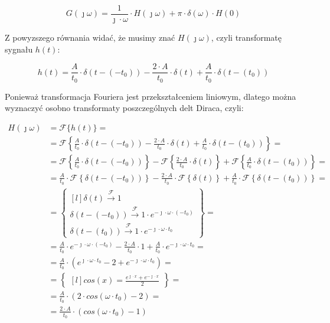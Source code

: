 \begin{task}
\begin{equation}
G(\jmath \omega) = \frac{1}{\jmath \cdot \omega} \cdot H(\jmath \omega) + \pi \cdot \delta(\omega) \cdot H(0)
\end{equation}

Z powyzszego równania widać, że musimy znać $H(\jmath \omega)$, czyli transformatę sygnału $h(t)$:

\begin{equation}
h(t) = \frac{A}{t_{0}} \cdot \delta(t-(-t_{0})) -\frac{2 \cdot A}{t_{0}} \cdot \delta(t) + \frac{A}{t_{0}} \cdot \delta(t-(t_{0}))
\end{equation}

Ponieważ transformacja Fouriera jest przekształceniem liniowym, dlatego można wyznaczyć osobno transformaty poszczególnych delt Diraca, czyli:

\begin{align*}
H(\jmath \omega)&={\mathcal F}\{h(t)\}=\\
&={\mathcal F}\left\{\frac{A}{t_{0}} \cdot \delta(t-(-t_{0})) -\frac{2 \cdot A}{t_{0}} \cdot \delta(t) + \frac{A}{t_{0}} \cdot \delta(t-(t_{0}))\right\}=\\
&={\mathcal F}\left\{\frac{A}{t_{0}} \cdot \delta(t-(-t_{0}))\right\} - {\mathcal F}\left\{\frac{2 \cdot A}{t_{0}} \cdot \delta(t)\right\} + {\mathcal F}\left\{\frac{A}{t_{0}} \cdot \delta(t-(t_{0}))\right\}=\\
&=\frac{A}{t_{0}} \cdot {\mathcal F}\left\{\delta(t-(-t_{0}))\right\} - \frac{2 \cdot A}{t_{0}} \cdot {\mathcal F}\left\{\delta(t)\right\} + \frac{A}{t_{0}} \cdot {\mathcal F}\left\{\delta(t-(t_{0}))\right\}=\\
&=\begin{Bmatrix*}[l]
\delta(t)\xrightarrow{\mathcal F} 1\\
\delta(t-(-t_{0}))\xrightarrow{\mathcal F} 1 \cdot e^{-\jmath \cdot \omega \cdot (-t_{0})}\\
\delta(t-(t_{0}))\xrightarrow{\mathcal F} 1 \cdot e^{-\jmath \cdot \omega \cdot t_{0}}
\end{Bmatrix*}=\\
&=\frac{A}{t_{0}} \cdot e^{-\jmath \cdot \omega \cdot (-t_{0})} - \frac{2 \cdot A}{t_{0}} \cdot 1 + \frac{A}{t_{0}} \cdot e^{-\jmath \cdot \omega \cdot t_{0}}=\\
&=\frac{A}{t_{0}} \cdot \left(e^{\jmath \cdot \omega \cdot t_{0}} -2 + e^{-\jmath \cdot \omega \cdot t_{0}}\right)=\\
&=\begin{Bmatrix*}[l]
cos(x)=\frac{e^{\jmath \cdot x} + e^{-\jmath \cdot x}}{2}
\end{Bmatrix*}=\\
&=\frac{A}{t_{0}} \cdot \left(2 \cdot cos(\omega \cdot t_{0}) -2\right)=\\
&=\frac{2 \cdot A}{t_{0}} \cdot \left(cos(\omega \cdot t_{0}) -1\right)
\end{align*}


\end{task}
